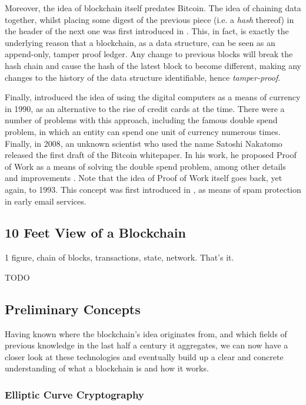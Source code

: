 Moreover, the idea of blockchain itself predates Bitcoin. The idea of chaining data together,
whilst placing some digest of the previous piece (i.e. a \textit{hash} thereof) in the header of the
next one was first introduced in \cite{haberHowTimestampDigital1991}. This, in fact, is exactly the
underlying reason that a blockchain, as a data structure, can be seen as an append-only, tamper proof
ledger. Any change to previous blocks will break the hash chain and cause the hash of the latest
block to become different, making any changes to the history of the data structure identifiable,
hence \textit{tamper-proof}.

Finally, \cite{chaumUntraceableElectronicCash1990} introduced the idea of using the digital
computers as a means of currency in 1990, as an alternative to the rise of credit cards at the time.
There were a number of problems with this approach, including the famous double spend problem, in
which an entity can spend one unit of currency numerous times. Finally, in 2008, an unknown scientist
who used the name Satoshi Nakatomo released the first draft of the Bitcoin whitepaper. In his work,
he proposed Proof of Work as a means of solving the double spend problem, among other details and
improvements \cite{nakamotoBitcoinPeertoPeerElectronic}. Note that the idea of Proof of Work itself
goes back, yet again, to 1993. This concept was first introduced in
\cite{dworkPricingProcessingCombatting1993}, as means of spam protection in early email services.

\subsection{10 Feet View of a Blockchain}

1 figure, chain of blocks, transactions, state, network. That's it.

TODO

\subsection{Preliminary Concepts} \label{chap_bg:sec:preliminary}

Having known where the blockchain's idea originates from, and which fields of previous knowledge in
the last half a century it aggregates, we can now have a closer look at these technologies and
eventually build up a clear and concrete understanding of what a blockchain is and how it works.

\subsubsection{Elliptic Curve Cryptography} \label{chap_bg:subsec:ecc}

